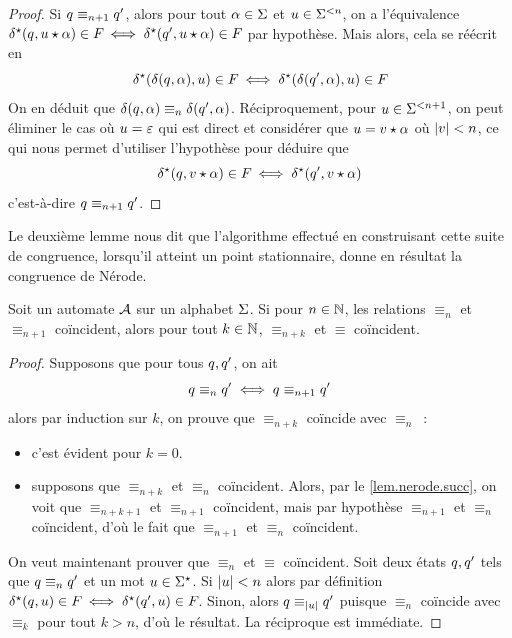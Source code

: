 \begin{proof}
  Si $q_{}\equiv_{n+1}q_{}'$, alors pour tout $\alpha\in \Sigma$ et
  $u \in \Sigma^{<n}$, on a l'équivalence
  $\delta_{}^{\star}(q_{},u\mathbin{\star} \alpha) \in F_{} \iff
  \delta_{}^{\star}(q_{}',u\mathbin{\star} \alpha) \in F_{}$
  par hypothèse. Mais alors, cela se réécrit en
  \[\delta_{}^{\star}(\delta_{}(q_{},\alpha),u)\in F_{} \iff
  \delta_{}^{\star}(\delta_{}(q_{}',\alpha),u)\in F_{}\]
  On en déduit que $\delta_{}(q_{},\alpha)\equiv_n \delta_{}(q_{}',\alpha)$.
  Réciproquement, pour $u \in \Sigma^{< n + 1}$, on peut éliminer le cas où
  $u = \varepsilon$ qui est direct et considérer que $u = v\mathbin{\star}\alpha$
  où $\left|v\right| < n$, ce qui nous permet d'utiliser l'hypothèse pour déduire que
  \[\delta_{}^{\star}(q_{},v\mathbin{\star} \alpha)\in F_{} \iff
  \delta_{}^{\star}(q_{}',v\mathbin{\star} \alpha)\]
  c'est-à-dire $q_{}\equiv_{n+1} q_{}'$.
\end{proof}

Le deuxième lemme nous dit que l'algorithme effectué en construisant cette suite
de congruence, lorsqu'il atteint un point stationnaire, donne en résultat la
congruence de Nérode.

\begin{lemma}
  Soit un automate $\mathcal{A}$ sur un alphabet $\Sigma$. Si pour $n \in \mathbb N$, les
  relations $\equiv_n$ et $\equiv_{n+1}$ coïncident, alors pour tout $k \in \mathbb N$,
  $\equiv_{n+k}$ et $\equiv$ coïncident.
\end{lemma}

\begin{proof}
  Supposons que pour tous $q_{},q_{}'$, on ait
  \[q_{}\equiv_n q_{}' \iff q_{}\equiv_{n+1} q_{}'\]
  alors par induction sur $k$, on prouve que $\equiv_{n+k}$ coïncide avec
  $\equiv_n$~:
  \begin{itemize}
  \item c'est évident pour $k = 0$.
  \item supposons que $\equiv_{n+k}$ et $\equiv_n$ coïncident. Alors, par le
    \cref{lem.nerode.succ}, on voit que $\equiv_{n+k+1}$ et $\equiv_{n+1}$
    coïncident, mais par hypothèse $\equiv_{n+1}$ et $\equiv_n$ coïncident,
    d'où le fait que $\equiv_{n+1}$ et $\equiv_n$ coïncident.
  \end{itemize}

  On veut maintenant prouver que $\equiv_n$ et $\equiv$ coïncident. Soit deux
  états $q_{},q_{}'$ tels que $q_{}\equiv_n q_{}'$ et un mot
  $u \in \Sigma^{\star}$. Si $\left|u\right| < n$ alors par définition
  $\delta_{}^{\star}(q_{},u) \in F_{} \iff \delta_{}^{\star}(q_{}',u) \in F_{}$.
  Sinon, alors $q_{}\equiv_{\left|u\right|} q_{}'$ puisque $\equiv_n$ coïncide avec
  $\equiv_k$ pour tout $k > n$, d'où le résultat. La réciproque est immédiate.
\end{proof}

